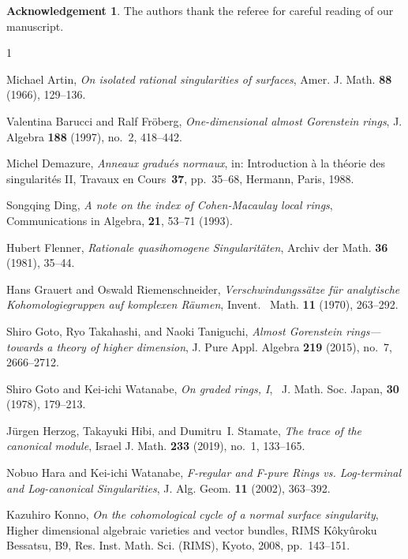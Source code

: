 \documentclass[12pt]{amsart}
\theoremstyle{definition}
\newtheorem*{acknowledgement}{Acknowledgement}
\theoremstyle{remark}
\numberwithin{equation}{section}
\renewcommand{\:}{\colon}
\begin{document}
\begin{acknowledgement}
The authors thank the referee for careful reading of our manuscript. 
\end{acknowledgement}

\begin{thebibliography}{1}

Michael Artin, \emph{On isolated rational singularities of surfaces}, 
Amer. J. Math. \textbf{88} (1966), 129--136.

Valentina Barucci and Ralf Fr\"oberg, 
\emph{One-dimensional almost {G}orenstein rings}, 
J. Algebra \textbf{188} (1997), no.~2, 418--442.

Michel Demazure, 
\emph{Anneaux gradu\'es normaux}, in: 
Introduction \`a la th\'eorie des singularit\'es II, Travaux en Cours~\textbf{37}, pp.~35--68, Hermann, Paris, 1988.

 Songqing Ding, 
\emph{A note on the index of Cohen-Macaulay local rings}, 
Communications in Algebra, {\bf 21}, 53--71 (1993). 

Hubert Flenner, \emph{Rationale quasihomogene 
{S}ingularit\" aten},
Archiv der Math. \textbf{36} (1981), 35--44.

      
Hans Grauert and Oswald Riemenschneider, \emph{Verschwindungss\"atze f\"ur
  analytische {K}ohomologiegruppen auf komplexen {R}\"aumen}, Invent. ~Math.
  \textbf{11} (1970), 263--292.

Shiro Goto, Ryo Takahashi, and Naoki Taniguchi, \emph{Almost {G}orenstein
  rings---towards a theory of higher dimension}, J. Pure Appl. Algebra
  \textbf{219} (2015), no.~7, 2666--2712.


Shiro Goto and Kei-ichi Watanabe,
\emph{On graded rings, I}, \ J. Math. Soc. Japan, {\bf 30} (1978), 
179--213.


J\"urgen Herzog, Takayuki Hibi, and Dumitru~I. Stamate, 
\emph{The trace of the
  canonical module}, Israel J. Math. \textbf{233} (2019), no.~1, 133--165.

 Nobuo Hara and Kei-ichi Watanabe,  
\emph{F-regular and F-pure Rings vs. Log-terminal and Log-canonical 
Singularities},
  J. Alg. Geom. {\bf 11} (2002), 363--392. 

Kazuhiro Konno, \emph{On the cohomological cycle of a normal surface
  singularity}, Higher dimensional algebraic varieties and vector bundles, RIMS
  K\^oky\^uroku Bessatsu, B9, Res. Inst. Math. Sci. (RIMS), Kyoto, 2008,
  pp.~143--151. 


\end{thebibliography}
\end{document}
